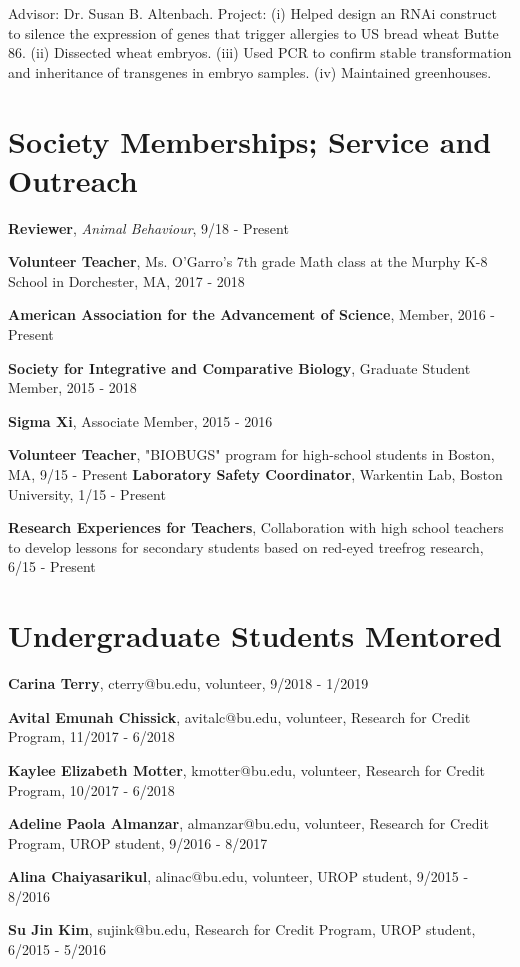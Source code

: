 \documentclass[margin,line]{res}
\begin{document}
\begin{resume}
\vspace{-.43cm}
{Advisor: Dr. Susan B. Altenbach. Project: (i) Helped design an RNAi construct to silence the expression of genes that trigger allergies to US bread wheat Butte 86. (ii) Dissected wheat embryos. (iii) Used PCR to confirm stable transformation and inheritance of transgenes in embryo samples. (iv) Maintained greenhouses.}

\section{\sc Society Memberships; Service and Outreach}

{\bf Reviewer}, {\it Animal Behaviour}, 9/18 - Present

{\bf Volunteer Teacher}, Ms. O'Garro's 7th grade Math class at the Murphy K-8 School in Dorchester, MA, 2017 - 2018

{\bf American Association for the Advancement of Science}, Member, 2016 - Present 

{\bf Society for Integrative and Comparative Biology}, Graduate Student Member, 2015 - 2018 

{\bf Sigma Xi},  Associate Member, 2015 - 2016 

{\bf Volunteer Teacher},  "BIOBUGS" program for high-school students in Boston, MA, 9/15 - Present 
{\bf Laboratory Safety Coordinator},  Warkentin Lab, Boston University, 1/15 - Present 

{\bf Research Experiences for Teachers},  Collaboration with high school teachers to develop lessons for secondary students based on red-eyed treefrog research, 6/15 - Present

\section{\sc Undergraduate Students Mentored}

{\bf Carina Terry}, cterry@bu.edu, volunteer, 9/2018 - 1/2019
\vspace*{-0.5mm}

{\bf Avital Emunah Chissick}, avitalc@bu.edu, volunteer, Research for Credit Program, 11/2017 - 6/2018
\vspace*{-0.5mm}

{\bf Kaylee Elizabeth Motter}, kmotter@bu.edu, volunteer, Research for Credit Program, 10/2017 - 6/2018
\vspace*{-0.5mm}

{\bf Adeline Paola Almanzar}, almanzar@bu.edu, volunteer, Research for Credit Program, UROP student, 9/2016 - 8/2017
\vspace*{-0.5mm}

{\bf Alina Chaiyasarikul}, alinac@bu.edu, volunteer, UROP student, 9/2015 - 8/2016
\vspace*{-0.5mm}

{\bf Su Jin Kim}, sujink@bu.edu, Research for Credit Program, UROP student, 6/2015 - 5/2016
\end{resume}
\end{document}
